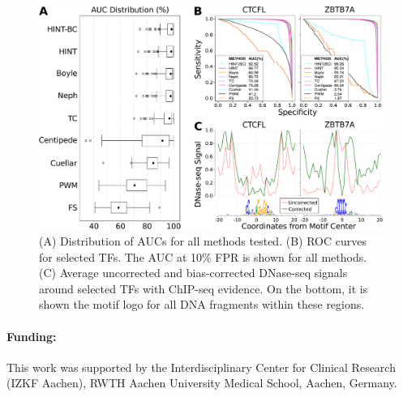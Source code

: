 \documentclass{AbstractTemplate}
\begin{document}
\begin{figure}[h!]
\hspace*{-1cm}
\includegraphics[width=1.1\textwidth]{Figure/Format/Fig_v2.pdf}
\caption{(A) Distribution of AUCs for all methods tested. (B) ROC curves for selected TFs. The AUC at 10\% FPR is shown for all methods. (C) Average uncorrected and bias-corrected DNase-seq signals around selected TFs with ChIP-seq evidence. On the bottom, it is shown the motif logo for all DNA fragments within these regions.}
\label{fig:allresults}
\end{figure}

\paragraph{Funding:}
This work was supported by the Interdisciplinary Center for Clinical Research (IZKF Aachen), RWTH Aachen University Medical School, Aachen, Germany.


{\footnotesize
}
\end{document}

